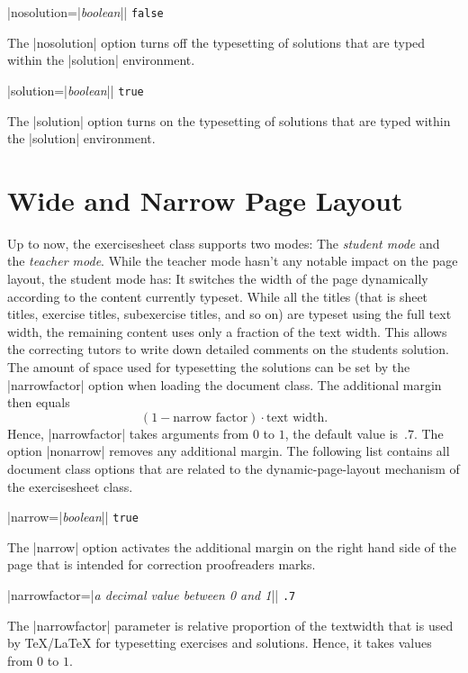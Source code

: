 \documentclass[a4paper,fleqn,9pt]{report}
\def\exercisesheet{{exercisesheet}}
\def\syntaxdefaultarg#1{\hfill\texttt{#1}\par\smallskip\noindent\ignorespaces}
\def\metaargument#1{\textit{#1}}
\begin{document}
\begin{syntax}
  |nosolution={|\metaargument{boolean}|}| \syntaxdefaultarg{false}
  The |nosolution| option turns off the typesetting of
  solutions that are typed within the |solution|
  environment.
\end{syntax}

\begin{syntax}
  |solution={|\metaargument{boolean}|}| \syntaxdefaultarg{true}
  The |solution| option turns on the typesetting of
  solutions that are typed within the |solution|
  environment.
\end{syntax}


\section{Wide and Narrow Page Layout}

Up to now, the \exercisesheet{} class supports two modes: The
\emph{student mode} and the \emph{teacher mode}. While the
teacher mode hasn't any notable impact on the page layout, the
student mode has: It switches the width of the page dynamically
according to the content currently typeset. While all the titles (that
is sheet titles, exercise titles, subexercise titles, and so on) are
typeset using the full text width, the remaining content uses only a
fraction of the text width. This allows the correcting tutors to write
down detailed comments on the students solution. The amount of space
used for typesetting the solutions can be set by the
|narrowfactor| option when loading the document class. The
additional margin then equals 
\begin{equation*}
  (1 - \text{narrow factor}) \cdot \text{text width}.
\end{equation*}
Hence, |narrowfactor| takes arguments from $0$ to $1$, the default
value is~$.7$. The option |nonarrow| removes any additional margin.
The following list contains all document class options that are
related to the dynamic-page-layout mechanism of the \exercisesheet{}
class.

\begin{syntax}
  |narrow={|\metaargument{boolean}|}| \syntaxdefaultarg{true}
  The |narrow| option activates the additional margin on the
  right hand side of the page that is intended for correction
  proofreaders marks. 
\end{syntax}

\begin{syntax}
  |narrowfactor={|\metaargument{a decimal value between 0 and 1}|}| 
  \syntaxdefaultarg{.7}
  The |narrowfactor| parameter is relative proportion of the
  textwidth that is used by \TeX{}/\LaTeX{} for typesetting exercises
  and solutions. Hence, it takes values from $0$ to $1$.
\end{syntax}
\end{document}

